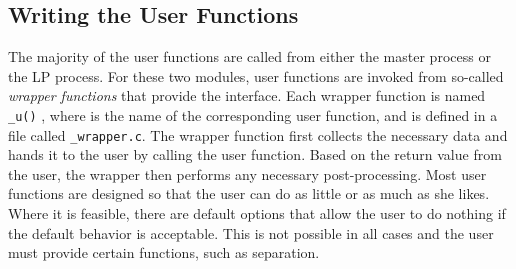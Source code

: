 \subsection{Writing the User Functions}

The majority of the user functions are called from either the master
process or the LP process. For these two modules, user functions are
invoked from so-called {\em wrapper functions} that provide the
interface. Each wrapper function is named {\tt *\_u()} , where {\tt *}
is the name of the corresponding user function, and is defined in a
file called {\tt *\_wrapper.c}. The wrapper function first collects
the necessary data and hands it to the user by calling the user
function. Based on the return value from the user, the wrapper then
performs any necessary post-processing. Most user functions are
designed so that the user can do as little or as much as she likes.
Where it is feasible, there are default options that allow the user to
do nothing if the default behavior is acceptable. This is not possible
in all cases and the user must provide certain functions, such as
separation.


